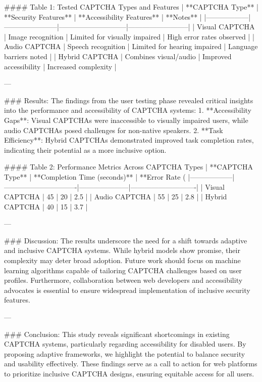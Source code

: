 #### Table 1: Tested CAPTCHA Types and Features
| **CAPTCHA Type** | **Security Features** | **Accessibility Features** | **Notes**                |
|------------------|-----------------------|-----------------------------|--------------------------|
| Visual CAPTCHA   | Image recognition     | Limited for visually impaired | High error rates observed |
| Audio CAPTCHA    | Speech recognition    | Limited for hearing impaired | Language barriers noted   |
| Hybrid CAPTCHA   | Combines visual/audio | Improved accessibility       | Increased complexity      |

---

### Results:
The findings from the user testing phase revealed critical insights into the performance and accessibility of CAPTCHA systems:
1. **Accessibility Gaps**: Visual CAPTCHAs were inaccessible to visually impaired users, while audio CAPTCHAs posed challenges for non-native speakers.
2. **Task Efficiency**: Hybrid CAPTCHAs demonstrated improved task completion rates, indicating their potential as a more inclusive option.

#### Table 2: Performance Metrics Across CAPTCHA Types
| **CAPTCHA Type** | **Completion Time (seconds)** | **Error Rate (%
|------------------|-------------------------------|---------------------|----------------------------|
| Visual CAPTCHA   | 45                           | 20                  | 2.5                        |
| Audio CAPTCHA    | 55                           | 25                  | 2.8                        |
| Hybrid CAPTCHA   | 40                           | 15                  | 3.7                        |

---

### Discussion:
The results underscore the need for a shift towards adaptive and inclusive CAPTCHA systems. While hybrid models show promise, their complexity may deter broad adoption. Future work should focus on machine learning algorithms capable of tailoring CAPTCHA challenges based on user profiles. Furthermore, collaboration between web developers and accessibility advocates is essential to ensure widespread implementation of inclusive security features.

---

### Conclusion:
This study reveals significant shortcomings in existing CAPTCHA systems, particularly regarding accessibility for disabled users. By proposing adaptive frameworks, we highlight the potential to balance security and usability effectively. These findings serve as a call to action for web platforms to prioritize inclusive CAPTCHA designs, ensuring equitable access for all users.

